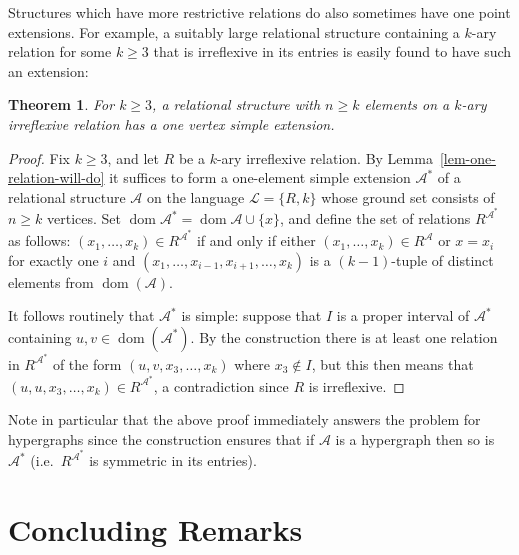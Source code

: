 \documentclass[11pt]{article}
\newtheorem{theorem}{Theorem}[section]
\begin{document}
Structures which have more restrictive relations do also sometimes have one point extensions. For example, a suitably large relational structure containing a $k$-ary relation for some $k\geq 3$ that is irreflexive in its entries is easily found to have such an extension:

\begin{theorem}For $k\geq 3$, a relational structure with $n\geq k$ elements on a $k$-ary irreflexive relation has a one vertex simple extension.\end{theorem}

\begin{proof}
Fix $k\geq 3$, and let $R$ be a $k$-ary irreflexive relation. By Lemma~\ref{lem-one-relation-will-do} it suffices to form a one-element simple extension ${\mathcal{A}}^*$ of a relational structure ${\mathcal{A}}$ on the language ${\mathcal{L}}=\{R,k\}$ whose ground set consists of $n\geq k$ vertices. Set ${\operatorname{dom}}{{\mathcal{A}}^*}={\operatorname{dom}}{\mathcal{A}}\cup\{x\}$, and define the set of relations $R^{{\mathcal{A}}^*}$ as follows: $(x_1,\ldots,x_k)\in R^{{\mathcal{A}}^*}$ if and only if either $(x_1,\ldots,x_k)\in R^{\mathcal{A}}$ or $x=x_i$ for exactly one $i$ and $(x_1,\ldots,x_{i-1},x_{i+1},\ldots,x_k)$ is a $(k-1)$-tuple of distinct elements from ${\operatorname{dom}}({\mathcal{A}})$.

It follows routinely that ${\mathcal{A}}^*$ is simple: suppose that $I$ is a proper interval of ${\mathcal{A}}^*$ containing $u,v\in {\operatorname{dom}}({\mathcal{A}}^*)$. By the construction there is at least one relation in $R^{{\mathcal{A}}^*}$ of the form $(u,v,x_3,\ldots,x_k)$ where $x_3\not\in I$, but this then means that $(u,u,x_3,\ldots,x_k)\in R^{{\mathcal{A}}^*}$, a contradiction since $R$ is irreflexive.
\end{proof}

Note in particular that the above proof immediately answers the problem for hypergraphs since the construction ensures that if ${\mathcal{A}}$ is a hypergraph then so is ${\mathcal{A}}^*$ (i.e.\ $R^{{\mathcal{A}}^*}$ is symmetric in its entries).

\section{Concluding Remarks}\label{sec-conclusion}
\end{document}
